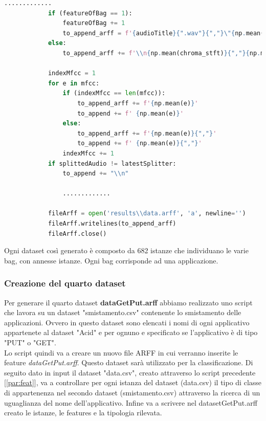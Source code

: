 \begin{lstlisting}[language=Python, caption=Arff formatting string, label = lst:splitFun]
                .............
            if (featureOfBag == 1):
                featureOfBag += 1
                to_append_arff = f'{audioTitle}{".wav"}{","}\"{np.mean(chroma_stft)}{","}{np.mean(spec_cent)}{","}{np.mean(spec_bw)}{","}{np.mean(rolloff)}{","}{np.mean(zcr)}{","}'
            else:
                to_append_arff += f'\\n{np.mean(chroma_stft)}{","}{np.mean(spec_cent)}{","}{np.mean(spec_bw)}{","}{np.mean(rolloff)}{","}{np.mean(zcr)}{","}'

            indexMfcc = 1
            for e in mfcc:
                if (indexMfcc == len(mfcc)): 
                    to_append_arff += f'{np.mean(e)}' 
                    to_append += f' {np.mean(e)}'
                else:
                    to_append_arff += f'{np.mean(e)}{","}' 
                    to_append += f' {np.mean(e)}{","}'
                indexMfcc += 1
            if splittedAudio != latestSplitter:
                to_append += "\\n"
                
                .............
                
            fileArff = open('results\\data.arff', 'a', newline='')
            fileArff.writelines(to_append_arff)
            fileArff.close()
\end{lstlisting}

Ogni dataset così generato è composto da 682 istanze che individuano le varie bag, con annesse istanze. Ogni bag corrisponde ad una applicazione. 

\subsubsection{Creazione del quarto dataset}
\label{subsub:quartodata}
Per generare il quarto dataset \textbf{dataGetPut.arff} abbiamo realizzato uno script che lavora su un dataset "smistamento.csv" contenente lo smistamento delle applicazioni. Ovvero in questo dataset sono elencati i nomi di ogni applicativo appartenete al dataset "Acid" e per ognuno e specificato se l'applicativo è di tipo "PUT" o "GET".  
\\Lo script quindi va a creare un nuovo file ARFF in cui verranno inserite le feature \textit{dataGetPut.arff}. Questo dataset sarà utilizzato per la classificazione. Di seguito dato in input il dataset "data.csv", creato attraverso lo script precedente [\ref{par:feat}], va a controllare per ogni istanza del dataset (data.csv) il tipo di classe di appartenenza nel secondo dataset (smistamento.csv) attraverso la ricerca di un uguaglianza del nome dell'applicativo. Infine va a scrivere nel datasetGetPut.arff creato le istanze, le features e la tipologia rilevata. 


